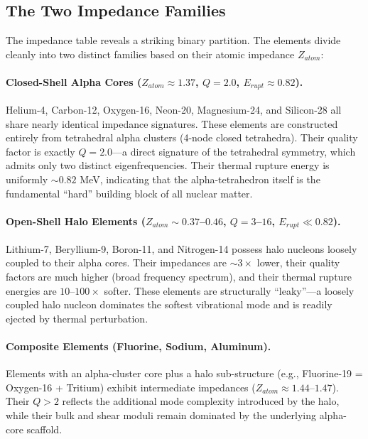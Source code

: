 \subsection{The Two Impedance Families}

The impedance table reveals a striking binary partition. The elements divide cleanly into two distinct families based on their atomic impedance $Z_{atom}$:

\paragraph{Closed-Shell Alpha Cores ($Z_{atom} \approx 1.37$, $Q = 2.0$, $E_{rupt} \approx 0.82$).}
Helium-4, Carbon-12, Oxygen-16, Neon-20, Magnesium-24, and Silicon-28 all share nearly identical impedance signatures. These elements are constructed entirely from tetrahedral alpha clusters (4-node closed tetrahedra). Their quality factor is exactly $Q = 2.0$---a direct signature of the tetrahedral symmetry, which admits only two distinct eigenfrequencies. Their thermal rupture energy is uniformly $\sim 0.82$ MeV, indicating that the alpha-tetrahedron itself is the fundamental ``hard'' building block of all nuclear matter.

\paragraph{Open-Shell Halo Elements ($Z_{atom} \sim 0.37$--$0.46$, $Q = 3$--$16$, $E_{rupt} \ll 0.82$).}
Lithium-7, Beryllium-9, Boron-11, and Nitrogen-14 possess halo nucleons loosely coupled to their alpha cores. Their impedances are $\sim 3\times$ lower, their quality factors are much higher (broad frequency spectrum), and their thermal rupture energies are $10$--$100\times$ softer. These elements are structurally ``leaky''---a loosely coupled halo nucleon dominates the softest vibrational mode and is readily ejected by thermal perturbation.

\paragraph{Composite Elements (Fluorine, Sodium, Aluminum).}
Elements with an alpha-cluster core plus a halo sub-structure (e.g., Fluorine-19 = Oxygen-16 + Tritium) exhibit intermediate impedances ($Z_{atom} \approx 1.44$--$1.47$). Their $Q > 2$ reflects the additional mode complexity introduced by the halo, while their bulk and shear moduli remain dominated by the underlying alpha-core scaffold.

